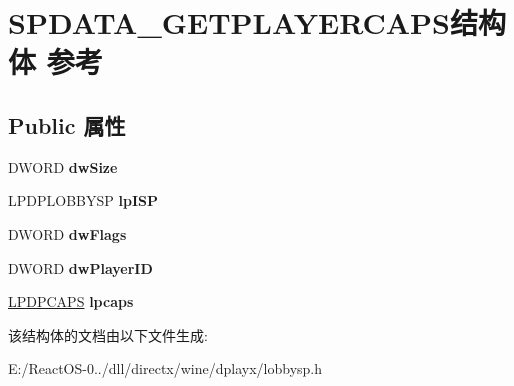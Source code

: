 \hypertarget{struct_s_p_d_a_t_a___g_e_t_p_l_a_y_e_r_c_a_p_s}{}\section{S\+P\+D\+A\+T\+A\+\_\+\+G\+E\+T\+P\+L\+A\+Y\+E\+R\+C\+A\+P\+S结构体 参考}
\label{struct_s_p_d_a_t_a___g_e_t_p_l_a_y_e_r_c_a_p_s}
\subsection*{Public 属性}
\begin{DoxyCompactItemize}
\item 
\mbox{\label{struct_s_p_d_a_t_a___g_e_t_p_l_a_y_e_r_c_a_p_s_a06e54b0a503923057e74a4182e9a66fa}} 
D\+W\+O\+RD {\bfseries dw\+Size}
\item 
\mbox{\label{struct_s_p_d_a_t_a___g_e_t_p_l_a_y_e_r_c_a_p_s_ae4f1b2d1d980ce5fe48f32a381cd5add}} 
L\+P\+D\+P\+L\+O\+B\+B\+Y\+SP {\bfseries lp\+I\+SP}
\item 
\mbox{\label{struct_s_p_d_a_t_a___g_e_t_p_l_a_y_e_r_c_a_p_s_ac27c9b116daa2b4d82b39600fd6ccd5e}} 
D\+W\+O\+RD {\bfseries dw\+Flags}
\item 
\mbox{\label{struct_s_p_d_a_t_a___g_e_t_p_l_a_y_e_r_c_a_p_s_a1b713a7ec9d2f50dda8ea4743065742f}} 
D\+W\+O\+RD {\bfseries dw\+Player\+ID}
\item 
\mbox{\label{struct_s_p_d_a_t_a___g_e_t_p_l_a_y_e_r_c_a_p_s_abbc882e4b87f1021793e68a60c0fd85e}} 
\hyperlink{structtag_d_p_c_a_p_s}{L\+P\+D\+P\+C\+A\+PS} {\bfseries lpcaps}
\end{DoxyCompactItemize}


该结构体的文档由以下文件生成\+:\begin{DoxyCompactItemize}
\item 
E\+:/\+React\+O\+S-\/0../dll/directx/wine/dplayx/lobbysp.\+h\end{DoxyCompactItemize}
